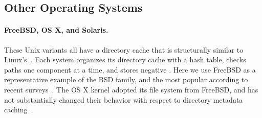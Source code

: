 \subsection{Other Operating Systems}

\paragraph{FreeBSD, OS X, and Solaris.}  These Unix variants all have a directory cache that is 
structurally similar to Linux's~\citep{osx-book, freebsd-book, solarisinternals}.  
Each system organizes its directory cache with a hash table, checks
paths one component at a time, and stores negative \dentries{}.
Here we use FreeBSD as a representative example of the BSD family, and the most popular according
to recent surveys~\citep{bsd-stats}.
The OS X kernel adopted its file system from FreeBSD, and has not substantially changed their behavior with
respect to directory metadata caching~\citep{lustre-xnu}.

